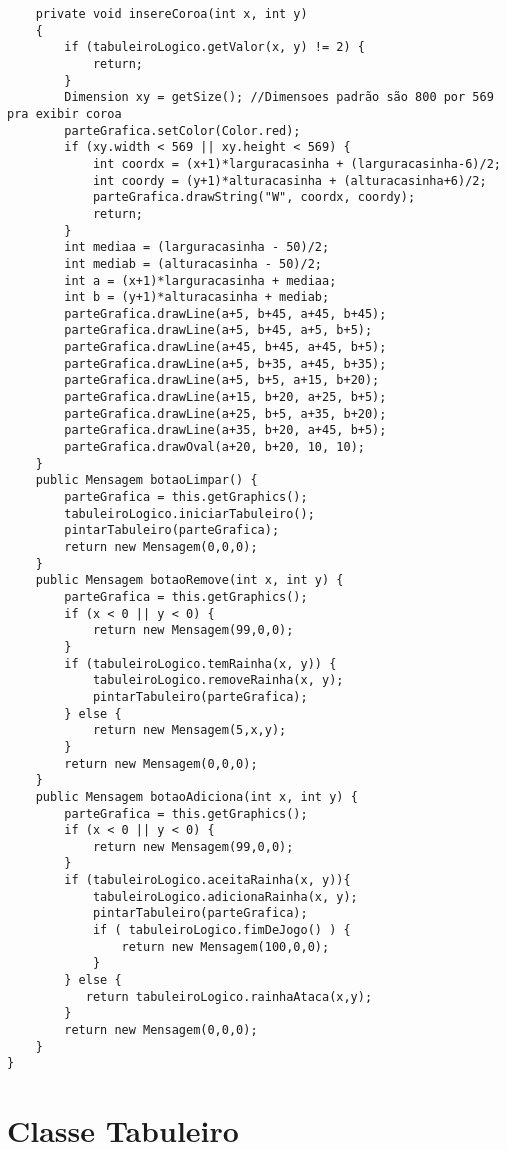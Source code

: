 \begin{lstlisting}
    private void insereCoroa(int x, int y)
    {
        if (tabuleiroLogico.getValor(x, y) != 2) {
            return;
        }
        Dimension xy = getSize(); //Dimensoes padrão são 800 por 569 pra exibir coroa
        parteGrafica.setColor(Color.red);
        if (xy.width < 569 || xy.height < 569) {
            int coordx = (x+1)*larguracasinha + (larguracasinha-6)/2;
            int coordy = (y+1)*alturacasinha + (alturacasinha+6)/2;
            parteGrafica.drawString("W", coordx, coordy);                                            
            return;
        }
        int mediaa = (larguracasinha - 50)/2; 
        int mediab = (alturacasinha - 50)/2;
        int a = (x+1)*larguracasinha + mediaa;
        int b = (y+1)*alturacasinha + mediab;
        parteGrafica.drawLine(a+5, b+45, a+45, b+45);
        parteGrafica.drawLine(a+5, b+45, a+5, b+5);
        parteGrafica.drawLine(a+45, b+45, a+45, b+5);
        parteGrafica.drawLine(a+5, b+35, a+45, b+35);
        parteGrafica.drawLine(a+5, b+5, a+15, b+20);
        parteGrafica.drawLine(a+15, b+20, a+25, b+5);
        parteGrafica.drawLine(a+25, b+5, a+35, b+20);
        parteGrafica.drawLine(a+35, b+20, a+45, b+5);
        parteGrafica.drawOval(a+20, b+20, 10, 10);
    }
    public Mensagem botaoLimpar() { 
        parteGrafica = this.getGraphics();
        tabuleiroLogico.iniciarTabuleiro();
        pintarTabuleiro(parteGrafica);
        return new Mensagem(0,0,0); 
    }
    public Mensagem botaoRemove(int x, int y) {
        parteGrafica = this.getGraphics();
        if (x < 0 || y < 0) {
            return new Mensagem(99,0,0);  
        }
        if (tabuleiroLogico.temRainha(x, y)) {
            tabuleiroLogico.removeRainha(x, y);
            pintarTabuleiro(parteGrafica);
        } else {
            return new Mensagem(5,x,y);
        }            
        return new Mensagem(0,0,0);
    }
    public Mensagem botaoAdiciona(int x, int y) {
        parteGrafica = this.getGraphics();
        if (x < 0 || y < 0) {
            return new Mensagem(99,0,0); 
        }   
        if (tabuleiroLogico.aceitaRainha(x, y)){
            tabuleiroLogico.adicionaRainha(x, y);         
            pintarTabuleiro(parteGrafica);
            if ( tabuleiroLogico.fimDeJogo() ) {
                return new Mensagem(100,0,0);
            }
        } else {
           return tabuleiroLogico.rainhaAtaca(x,y);
        }
        return new Mensagem(0,0,0);
    }
}

\end{lstlisting}
\newpage
\section{Classe Tabuleiro}


